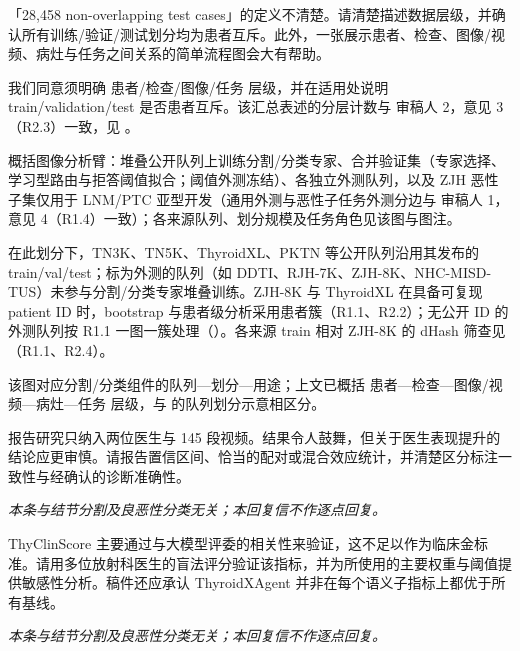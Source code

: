 \begin{reviewercomment}
「28,458 non-overlapping test cases」的定义不清楚。请清楚描述数据层级，并确认所有训练/验证/测试划分均为患者互斥。此外，一张展示患者、检查、图像/视频、病灶与任务之间关系的简单流程图会大有帮助。
\end{reviewercomment}
\begin{authorresponse}
我们同意须明确 患者/检查/图像/任务 层级，并在适用处说明 train/validation/test 是否患者互斥。该汇总表述的分层计数与 审稿人 2，意见 3（R2.3）一致，见 。\par
{} 概括图像分析臂：堆叠公开队列上训练分割/分类专家、合并验证集（专家选择、学习型路由与拒答阈值拟合；阈值外测冻结）、各独立外测队列，以及 ZJH 恶性子集仅用于 LNM/PTC 亚型开发（通用外测与恶性子任务外测分边与 审稿人 1，意见 4（R1.4）一致）；各来源队列、划分规模及任务角色见该图与图注。\par
在此划分下，TN3K、TN5K、ThyroidXL、PKTN 等公开队列沿用其发布的 train/val/test；标为外测的队列（如 DDTI、RJH-7K、ZJH-8K、NHC-MISD-TUS）未参与分割/分类专家堆叠训练。ZJH-8K 与 ThyroidXL 在具备可复现 patient ID 时，bootstrap 与患者级分析采用患者簇（R1.1、R2.2）；无公开 ID 的外测队列按 R1.1 一图一簇处理（）。各来源 train 相对 ZJH-8K 的 dHash 筛查见 （R1.1、R2.4）。\par
该图对应分割/分类组件的队列—划分—用途；上文已概括 患者—检查—图像/视频—病灶—任务 层级，与  的队列划分示意相区分。\par
\par
\end{authorresponse}

\begin{reviewercomment}
报告研究只纳入两位医生与 145 段视频。结果令人鼓舞，但关于医生表现提升的结论应更审慎。请报告置信区间、恰当的配对或混合效应统计，并清楚区分标注一致性与经确认的诊断准确性。
\end{reviewercomment}
\begin{authorresponse}
\noindent\textit{本条与结节分割及良恶性分类无关；本回复信不作逐点回复。}
\end{authorresponse}

\begin{reviewercomment}
ThyClinScore 主要通过与大模型评委的相关性来验证，这不足以作为临床金标准。请用多位放射科医生的盲法评分验证该指标，并为所使用的主要权重与阈值提供敏感性分析。稿件还应承认 ThyroidXAgent 并非在每个语义子指标上都优于所有基线。
\end{reviewercomment}
\begin{authorresponse}
\noindent\textit{本条与结节分割及良恶性分类无关；本回复信不作逐点回复。}
\end{authorresponse}

